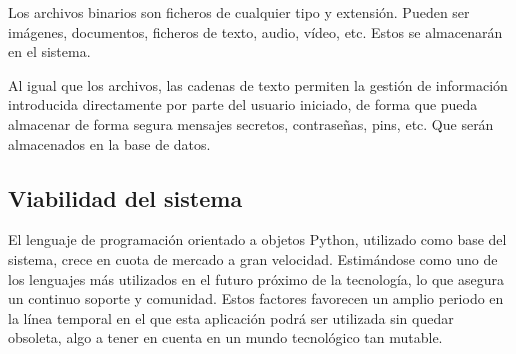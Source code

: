 \documentclass[a4paper, 11pt, titlepage]{article}
\begin{document}
            Los archivos binarios son ficheros de cualquier tipo y extensión. Pueden 
            ser imágenes, documentos, ficheros de texto, audio, vídeo, etc. Estos se 
            almacenarán en el sistema.

            Al igual que los archivos, las cadenas de texto permiten la gestión de 
            información introducida directamente por parte del usuario iniciado, de 
            forma que pueda almacenar de forma segura mensajes secretos, contraseñas, 
            pins, etc. Que serán almacenados en la base de datos.

    \subsection{Viabilidad del sistema}

        El lenguaje de programación orientado a objetos Python, utilizado como base 
        del sistema, crece en cuota de mercado a gran velocidad. Estimándose como uno 
        de los lenguajes más utilizados en el futuro próximo de la tecnología, lo que 
        asegura un continuo soporte y comunidad. Estos factores favorecen un amplio 
        periodo en la línea temporal en el que esta aplicación podrá ser utilizada sin 
        quedar obsoleta, algo a tener en cuenta en un mundo tecnológico tan mutable.
\end{document}
